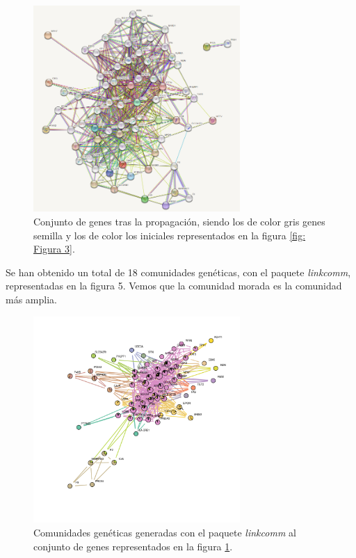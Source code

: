  \begin{figure}[h]
 	\centering
 	\includegraphics[width=0.70\textwidth]{figures/network_propagation.png}
 	\caption{Conjunto de genes tras la propagación, siendo los de color gris genes semilla y los de color los iniciales representados en la figura \ref{fig: Figura 3}.}
 	\label{fig: Figura 4}
 \end{figure} 
\newpage
Se han obtenido un total de 18 comunidades genéticas, con el paquete \textit{linkcomm}, representadas en la figura 5. Vemos que la comunidad morada es la comunidad más amplia. 

 \begin{figure}[h]
	\centering
	\includegraphics[width=0.70\textwidth]{figures/01_NetworkComunidades.png}
	\caption{Comunidades genéticas generadas con el paquete \textit{linkcomm} al conjunto de genes representados en la figura  \ref{fig: Figura 4}.}
	\label{fig: Figura 5}
\end{figure}

